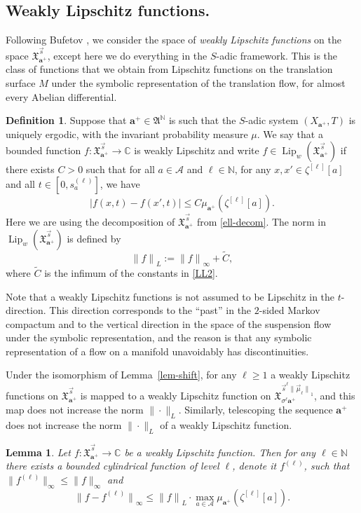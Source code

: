 \documentclass[JEP,XML,SOM,Unicode]{cedram}
\let\mathcal\mathscr
\theoremstyle{plain}
\newtheorem{lemma}[theorem]{Lemma}
\theoremstyle{definition}
\newtheorem{defi}[theorem]{Definition}
\let\wt\widetilde
\DeclareMathOperator{\Lip}{Lip}
\newcommand\bom{{\boldsymbol a}}\let\ba\bom
\let\sig\sigma
\newcommand\FrA{\mathfrak{A}}
\newcommand\Xx{\mathfrak{X}}
\newcommand\Ak{\mathcal{A}}
\newcommand{\C}{\mathbb{C}}
\newcommand{\N}{\mathbb{N}}
\newcommand\be{\begin{equation}}
\newcommand\ee{\end{equation}}
\begin{document}
\subsection{Weakly Lipschitz functions.} \label{sec-weakl}
Following Bufetov \cite{Bufetov1, Buf-umn}, we consider the space of \emph{weakly Lipschitz functions} on the space $\Xx_{\ba^+}^{\vec{s}}$, except here we do everything in the $S$-adic framework. This is the class of functions that we obtain from Lipschitz functions on the translation surface $M$ under the symbolic representation of the translation flow, for almost every Abelian
differential.

\begin{defi}
Suppose that $\ba^+\in \FrA^\N$ is such that the $S$-adic system $(X_{\ba^+},T)$ is uniquely ergodic, with the invariant probability measure $\mu$.
We say that a bounded function $f:\Xx_{\ba^+}^{\vec{s}}\to \C$ is weakly Lipschitz and write $f\in \Lip_w (\Xx_{\ba^+}^{\vec{s}})$
if there exists $C>0$ such that for all $a\in \Ak$ and $\ell\in \N$, for any $x,x'\in \zeta^{[\ell]}[a]$ and all $t\in [0, s_a^{(\ell)}]$, we have
\be \label{LL2}
|f(x,t)-f(x',t)|\le C \mu_{\ba^+}(\zeta^{[\ell]}[a]).
\ee
Here we are using the decomposition of $\Xx_{\ba^+}^{\vec{s}}$ from \eqref{ell-decom}.
The norm in $\Lip_w (\Xx_{\ba^+}^{\vec{s}})$ is defined by
\be \label{Lip-norm}
{\|f\|}_L:= {\|f\|}_\infty + \wt{C},
\ee
where $\wt{C}$ is the infimum of the constants in \eqref{LL2}.
\end{defi}

Note that a weakly Lipschitz functions is not assumed to be Lipschitz in the $t$\nobreakdash-direction. This direction corresponds to the ``past'' in the $2$-sided Markov compactum and to the vertical direction in the space of the suspension flow under the symbolic representation, and the reason is that any symbolic representation of a flow on a manifold unavoidably has discontinuities.

Under the isomorphism of Lemma~\ref{lem-shift}, for any $\ell\ge 1$ a weakly Lipschitz functions on $\Xx_{\ba^+}^{\vec{s}}$ is mapped to a weakly Lipschitz function on
$\Xx_{\sig^\ell\ba^+}^{\vec{s}^{\ell}{\|\vec \mu_\ell\|}_1}$, and this map does not increase the norm $\|\cdot\|_L$. Similarly, telescoping the sequence $\ba^+$ does not increase the norm $\|\cdot\|_L$
of a weakly Lipschitz function.

\begin{lemma} \label{lem-approx}
Let $f:\Xx_{\ba^+}^{\vec{s}}\to \C$ be a weakly Lipschitz function. Then for any $\ell\in \N$ there exists a bounded cylindrical function of level $\ell$, denote it $f^{(\ell)}$, such that
$\|f^{(\ell)}\|_\infty \le \|f\|_\infty$ and
\[
{\|f - f^{(\ell)}\|}_\infty \le {\|f\|}_L\cdot \max_{a\in \Ak} \mu_{\bom^+}(\zeta^{[\ell]}[a]).
\]
\end{lemma}
\end{document}
